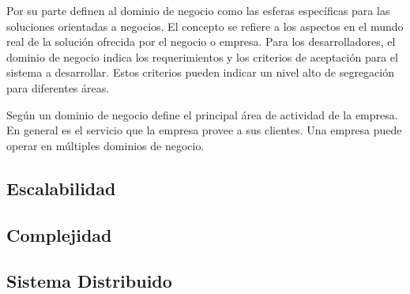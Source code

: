 Por su parte \cite{heidari2021ontology} definen al dominio de negocio como las esferas específicas
para las soluciones orientadas a negocios.
El concepto se refiere a los aspectos en el mundo real de la solución ofrecida por el negocio o empresa.
Para los desarrolladores, el dominio de negocio indica los requerimientos y los criterios de aceptación
para el sistema a desarrollar.
Estos criterios pueden indicar un nivel alto de segregación para diferentes áreas.

Según \cite{khononov2021learning} un dominio de negocio define el principal área de actividad de
la empresa. En general es el servicio que la empresa provee a sus clientes.
Una empresa puede operar en múltiples dominios de negocio.


\subsection{Escalabilidad}


\subsection{Complejidad}


\subsection{Sistema Distribuido}

